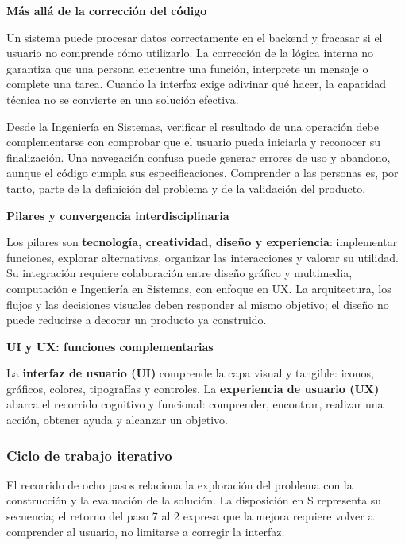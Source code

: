\par\textbf{\textcolor{unabblue}{\faLightbulb}\quad Más allá de la corrección del código}\par
Un sistema puede procesar datos correctamente en el backend y fracasar si el
usuario no comprende cómo utilizarlo. La corrección de la lógica interna no
garantiza que una persona encuentre una función, interprete un mensaje o complete
una tarea. Cuando la interfaz exige adivinar qué hacer, la capacidad técnica
no se convierte en una solución efectiva.

Desde la Ingeniería en Sistemas, verificar el resultado de una operación debe
complementarse con comprobar que el usuario pueda iniciarla y reconocer su
finalización. Una navegación confusa puede generar errores de uso y abandono,
aunque el código cumpla sus especificaciones. Comprender a las personas es,
por tanto, parte de la definición del problema y de la validación del producto.

\par\textbf{\textcolor{unabblue}{\faCogs}\quad Pilares y convergencia interdisciplinaria}\par
Los pilares son \textbf{tecnología, creatividad, diseño y experiencia}:
implementar funciones, explorar alternativas, organizar las interacciones y
valorar su utilidad. Su integración requiere colaboración entre diseño gráfico
y multimedia, computación e Ingeniería en Sistemas, con enfoque en UX.
La arquitectura, los flujos y las decisiones visuales deben responder al mismo
objetivo; el diseño no puede reducirse a decorar un producto ya construido.

\par\textbf{\textcolor{unabblue}{\faUsers}\quad UI y UX: funciones complementarias}\par
La \textbf{interfaz de usuario (UI)} comprende la capa visual y tangible:
iconos, gráficos, colores, tipografías y controles. La \textbf{experiencia de
usuario (UX)} abarca el recorrido cognitivo y funcional: comprender, encontrar,
realizar una acción, obtener ayuda y alcanzar un objetivo.

\clearpage
\subsubsection*{\textcolor{unabblue}{}\quad Ciclo de trabajo iterativo}
El recorrido de ocho pasos relaciona la exploración del problema con la
construcción y la evaluación de la solución. La disposición en S representa
su secuencia; el retorno del paso 7 al 2 expresa que la mejora requiere volver
a comprender al usuario, no limitarse a corregir la interfaz.

